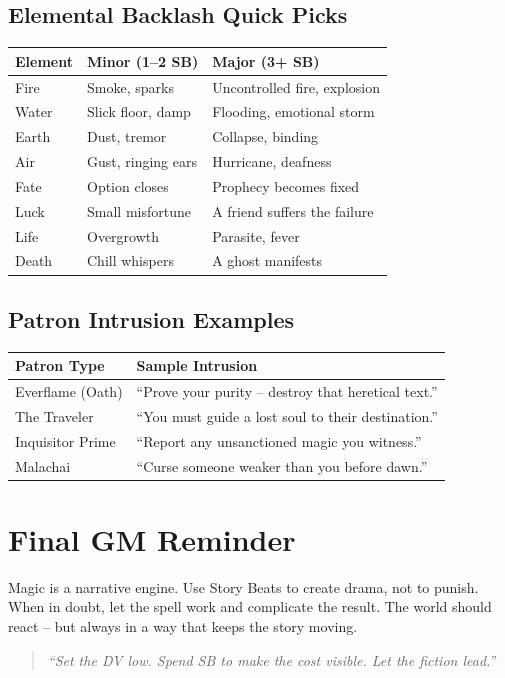 \subsection*{Elemental Backlash Quick Picks}
\begin{center}
\begin{tabular}{lll}
\toprule
\textbf{Element} & \textbf{Minor (1–2 SB)} & \textbf{Major (3+ SB)} \\
\midrule
Fire & Smoke, sparks & Uncontrolled fire, explosion \\
Water & Slick floor, damp & Flooding, emotional storm \\
Earth & Dust, tremor & Collapse, binding \\
Air & Gust, ringing ears & Hurricane, deafness \\
Fate & Option closes & Prophecy becomes fixed \\
Luck & Small misfortune & A friend suffers the failure \\
Life & Overgrowth & Parasite, fever \\
Death & Chill whispers & A ghost manifests \\
\bottomrule
\end{tabular}
\end{center}

\subsection*{Patron Intrusion Examples}
\begin{center}
\begin{tabular}{ll}
\toprule
\textbf{Patron Type} & \textbf{Sample Intrusion} \\
\midrule
Everflame (Oath) & ``Prove your purity – destroy that heretical text.'' \\
The Traveler & ``You must guide a lost soul to their destination.'' \\
Inquisitor Prime & ``Report any unsanctioned magic you witness.'' \\
Malachai & ``Curse someone weaker than you before dawn.'' \\
\bottomrule
\end{tabular}
\end{center}

\section*{Final GM Reminder}
Magic is a narrative engine. Use Story Beats to create drama, not to punish. When in doubt, let the spell work and complicate the result. The world should react – but always in a way that keeps the story moving.

\begin{quote}
\emph{``Set the DV low. Spend SB to make the cost visible. Let the fiction lead.''}
\end{quote}